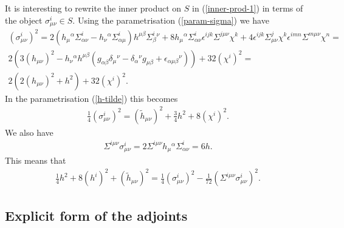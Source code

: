 \documentclass[10pt]{report}
\theoremstyle{definition}
\begin{document}
It is interesting to rewrite the inner product on $S$ in (\ref{inner-prod-1}) in terms of the object $\sigma^i_{\mu\nu}\in S$. Using the parametrisation (\ref{param-sigma}) we have
\begin{align}\nonumber
(\sigma^i_{\mu\nu})^2 = 2 (h_\mu{}^\alpha \Sigma^i_{\alpha\nu} - h_\nu{}^\alpha \Sigma^i_{\alpha\mu}) h^{\mu\beta} \Sigma^i_\beta{}^\nu + 8 h_\mu{}^\alpha \Sigma^i_{\alpha\nu} \epsilon^{ijk} \Sigma^{j\mu\nu} \chi^k + 4 \epsilon^{ijk} \Sigma^j_{\mu\nu} \chi^k \epsilon^{imn} \Sigma^{m\mu\nu} \chi^n= \\ \nonumber
2( 3 (h_{\mu\nu})^2 - h_\nu{}^\alpha h^{\mu\beta} ( g_{\alpha\beta} \delta_\mu{}^\nu - \delta_\alpha{}^\nu g_{\mu\beta} + \epsilon_{\alpha\mu\beta}{}^\nu)) + 32 (\chi^i)^2 = \\ \nonumber
2( 2(h_{\mu\nu})^2 + h^2) + 32 (\chi^i)^2.
\end{align}
In the parametrisation (\ref{h-tilde}) this becomes
\begin{align}
\frac{1}{4} (\sigma^i_{\mu\nu})^2 = (\tilde{h}_{\mu\nu})^2 + \frac{3}{4} h^2 + 8 (\chi^i)^2.
\end{align}
We also have
\begin{align}
\Sigma^{i\mu\nu} \sigma^i_{\mu\nu} = 2 \Sigma^{i\mu\nu} h_\mu{}^\alpha \Sigma^i_{\alpha\nu} = 6h.
\end{align}
This means that 
\begin{align}
\frac{1}{4} h^2 + 8 (h^i)^2 +  (\tilde{h}_{\mu\nu})^2 = \frac{1}{4} (\sigma^i_{\mu\nu})^2 - \frac{1}{72} ( \Sigma^{i\mu\nu} \sigma^i_{\mu\nu} )^2.
\end{align}

\subsection{Explicit form of the adjoints}
\end{document}
